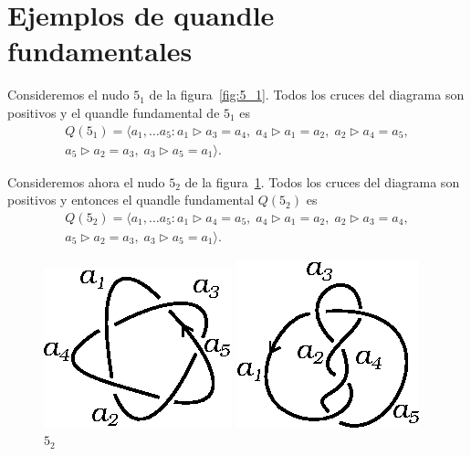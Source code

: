 \documentclass[graybox]{svmult}
\begin{document}
\section{Ejemplos de quandle fundamentales}

	\label{block:5_1:fundamental_quandle}
	\label{block:5_2:fundamental_quandle}

    Consideremos el nudo $5_1$ de la figura~\ref{fig:5_1}. Todos los cruces del
    diagrama son positivos y el quandle fundamental de $5_1$ es
	\begin{multline}
        \label{eq:5_1}
        Q(5_1)=\langle a_1,\dots a_5:
		a_1\triangleright a_3=a_4,\;
        a_4\triangleright a_1=a_2,\;
        a_2\triangleright a_4=a_5,\\
        a_5\triangleright a_2=a_3,\; 
        a_3\triangleright a_5=a_1\rangle.
    \end{multline}

    Consideremos ahora el nudo $5_2$ de la figura~\ref{fig:5_2}. Todos los
    cruces del diagrama son positivos y entonces el quandle fundamental
    $Q(5_2)$ es
	\begin{multline}
        Q(5_2)=\langle a_1,\dots a_5:
		a_1\triangleright a_4=a_5,\;
		a_4\triangleright a_1=a_2,\;
		a_2\triangleright a_3=a_4,\\
		a_5\triangleright a_2=a_3,\;
		a_3\triangleright a_5=a_1\rangle.
	\end{multline}

	\begin{figure}[ht]
		\centering
		\begin{minipage}{0.3\textwidth}
			\centering
			\includegraphics[scale=0.6]{images/5_1}
			\caption{$5_1$}
			\label{fig:5_1}
		\end{minipage}
		\begin{minipage}{0.3\textwidth}
			\centering
			\includegraphics[scale=0.6]{images/5_2}
			\caption{$5_2$}
			\label{fig:5_2}
		\end{minipage}
	\end{figure}
\end{document}
